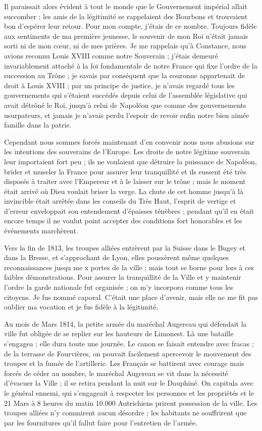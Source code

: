 \documentclass[11pt,a4paper]{report}
\begin{document}
Il paraissait alors évident à tout le monde que le Gouvernement impérial allait succomber ; les amis de la légitimité se rappelaient des Bourbons et trouvaient bon d'espérer leur retour. Pour mon compte, j'étais de ce nombre. Toujours fidèle aux sentiments de ma première jeunesse, le souvenir de mon Roi n'était jamais sorti ni de mon cœur, ni de mes prières. Je me rappelais qu'à Constance, nous avions reconnu Louis XVIII comme notre Souverain ; j'étais demeuré invariablement attaché à la foi fondamentale de notre France qui fixe l'ordre de la succession au Trône ; je savais par conséquent que la couronne appartenait de droit à Louis XVIII ; par un principe de justice, je n'avais regardé tous les gouvernements qui s'étaient succédés depuis celui de l'assemblée législative qui avait détrôné le Roi, jusqu'à celui de Napoléon que comme des gouvernements usurpateurs, et jamais je n'avais perdu l'espoir de revoir enfin notre bien aimée famille dans la patrie.

Cependant nous sommes forcés maintenant d'en convenir nous nous abusions sur les intentions des souverains de l'Europe. Les droits de notre légitime souverain leur importaient fort peu ; ils ne voulaient que détruire la puissance de Napoléon, brider et museler la France pour assurer leur tranquillité et ils eussent été très disposés à traiter avec l'Empereur et à le laisser sur le trône ; mais le moment était arrivé où Dieu voulait briser la verge. La chute de cet homme jusqu'à là invincible était arrêtée dans les conseils du Très Haut, l'esprit de vertige et d'erreur enveloppait son entendement d'épaisses ténèbres ; pendant qu'il en était encore temps il ne voulut point accepter des conditions fort honorables et les événements marchèrent.

Vers la fin de 1813, les troupes alliées entrèrent par la Suisse dans le Bugey et dans la Bresse, et s'approchant de Lyon, elles poussèrent même quelques reconnaissances jusqu me x portes de la ville ; mais tout se borne pour lors à ces faibles démonstrations. Pour assurer la tranquillité de la Ville et y maintenir l'ordre la garde nationale fut organisée ; on m'y incorpora comme tous les citoyens. Je fus nommé caporal. C'était une place d'avenir, mais elle ne me fit pas oublier ma vocation et je fus fidèle à la légitimité.

Au mois de Mars 1814, la petite armée du maréchal Augereau qui défendait la ville fut obligée de se replier sur les hauteurs de Limonest. Là une bataille s'engagea ; elle dura toute une journée. Le canon se faisait entendre avec fracas ; de la terrasse de Fourvières, on pouvait facilement apercevoir le mouvement des troupes et la fumée de l'artillerie. Les Français se battirent avec courage mais forcés de céder au nombre, le maréchal Augereau se vit dans la nécessité d'évacuer la Ville ; il se retira pendant la nuit sur le Dauphiné. On capitula avec le général ennemi, qui s'engageait à respecter les personnes et les propriétés et le 21 Mars à 8 heures du matin 10.000 Autrichiens prirent possession de la ville. Les troupes alliées n'y commirent aucun désordre ; les habitants ne souffrirent que par les fournitures qu'il fallut faire pour l'entretien de l'armée.
\end{document}
